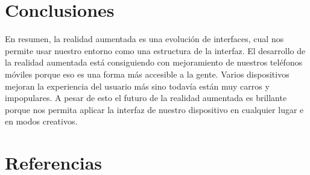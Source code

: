 \documentclass[a4paper,11pt]{scrartcl}
\begin{document}
\section{Conclusiones}
En resumen, la realidad aumentada es una evolución de interfaces, cual nos permite usar nuestro entorno como una estructura de la interfaz. El desarrollo de la realidad aumentada está consiguiendo con mejoramiento de nuestros teléfonos móviles porque eso es una forma más accesible a la gente. Varios dispositivos mejoran la experiencia del usuario más sino todavía están muy carros y impopulares. A pesar de esto el futuro de la realidad aumentada es brillante porque nos permita aplicar la interfaz de nuestro dispositivo en cualquier lugar e en modos creativos.

\section{Referencias}
\printbibliography
\end{document}
